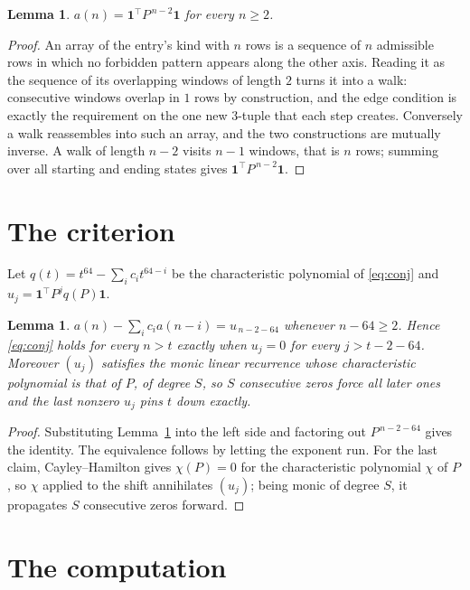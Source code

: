 \documentclass[11pt,a4paper]{article}
\theoremstyle{plain}
\newtheorem{lemma}[theorem]{Lemma}
\theoremstyle{definition}
\begin{document}
\begin{lemma}\label{lem:walk}
$a(n)=\mathbf{1}^{\!\top}P^{\,n-2}\mathbf{1}$ for every $n\ge2$.
\end{lemma}

\begin{proof}
An array of the entry's kind with $n$ rows is a sequence of $n$ admissible rows in
which no forbidden pattern appears along the other axis. Reading it as the sequence of its
overlapping windows of length $2$ turns it into a walk: consecutive windows overlap in
$1$ rows by construction, and the edge condition is exactly the requirement on the one
new $3$-tuple that each step creates. Conversely a walk reassembles into such an array,
and the two constructions are mutually inverse. A walk of length $n-2$ visits $n-1$
windows, that is $n$ rows; summing over all starting and ending states gives
$\mathbf{1}^{\!\top}P^{\,n-2}\mathbf{1}$.
\end{proof}

\section{The criterion}

Let $q(t)=t^{64}-\sum_i c_i t^{64-i}$ be the characteristic polynomial of
\eqref{eq:conj} and $u_j=\mathbf{1}^{\!\top}P^{j}q(P)\mathbf{1}$.

\begin{lemma}\label{lem:crit}
$a(n)-\sum_i c_i a(n-i)=u_{\,n-2-64}$ whenever $n-64\ge2$. Hence
\eqref{eq:conj} holds for every $n>t$ exactly when $u_j=0$ for every
$j>t-2-64$. Moreover $(u_j)$ satisfies the monic linear recurrence whose
characteristic polynomial is that of $P$, of degree $S$, so $S$ consecutive zeros force all
later ones and the last nonzero $u_j$ pins $t$ down exactly.
\end{lemma}

\begin{proof}
Substituting Lemma~\ref{lem:walk} into the left side and factoring out
$P^{\,n-2-64}$ gives the identity. The equivalence follows by letting the exponent
run. For the last claim, Cayley--Hamilton gives $\chi(P)=0$ for the characteristic
polynomial $\chi$ of $P$, so $\chi$ applied to the shift annihilates $(u_j)$; being monic of
degree $S$, it propagates $S$ consecutive zeros forward.
\end{proof}

\section{The computation}
\end{document}
